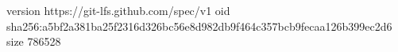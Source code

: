 version https://git-lfs.github.com/spec/v1
oid sha256:a5bf2a381ba25f2316d326bc56e8d982db9f464c357bcb9fecaa126b399ec2d6
size 786528
